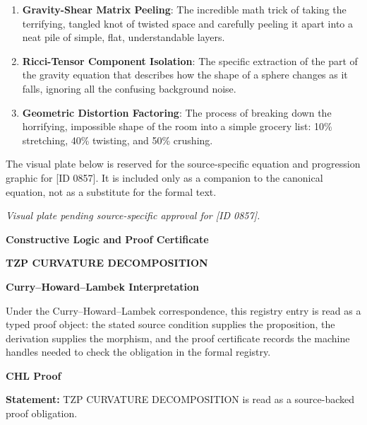 \begin{enumerate}[leftmargin=1.6em,itemsep=6pt,topsep=4pt]
\item \textbf{Gravity-Shear Matrix Peeling}: The incredible math trick of taking the terrifying, tangled knot of twisted space and carefully peeling it apart into a neat pile of simple, flat, understandable layers.
\item \textbf{Ricci-Tensor Component Isolation}: The specific extraction of the part of the gravity equation that describes how the shape of a sphere changes as it falls, ignoring all the confusing background noise.
\item \textbf{Geometric Distortion Factoring}: The process of breaking down the horrifying, impossible shape of the room into a simple grocery list: 10\% stretching, 40\% twisting, and 50\% crushing.
\end{enumerate}

\begingroup\footnotesize\sloppy
The visual plate below is reserved for the source-specific equation and progression graphic for [ID 0857]. It is included only as a companion to the canonical equation, not as a substitute for the formal text.
\par\endgroup
\begingroup\footnotesize\itshape
Visual plate pending source-specific approval for [ID 0857].
\par\endgroup

\clearpage
\begingroup\tzpsupportsetup
\noindent\textbf{\fontsize{10.8pt}{12.8pt}\selectfont [ID 0857] Constructive Logic and Proof Certificate}\par
\noindent\textbf{\fontsize{10pt}{12pt}\selectfont TZP CURVATURE DECOMPOSITION}\par
\vspace{0.45em}
\begingroup
\footnotesize
\setlength{\parskip}{0.22em}
\setlength{\parindent}{0pt}
\noindent\textbf{Curry--Howard--Lambek Interpretation}\par
Under the Curry--Howard--Lambek correspondence, this registry entry is read as a typed proof
object: the stated source condition supplies the proposition, the derivation supplies the
morphism, and the proof certificate records the machine handles needed to check the obligation
in the formal registry.

\vspace{0.45em}
\noindent\textbf{CHL Proof}\par
\textbf{Statement:} TZP CURVATURE DECOMPOSITION is read as a source-backed proof obligation.

